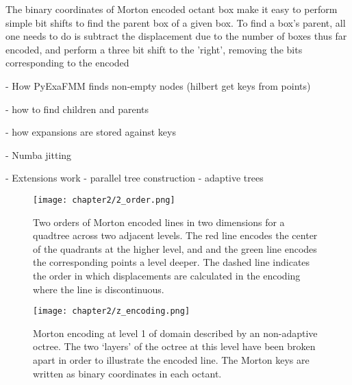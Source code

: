 The binary coordinates of Morton encoded octant box make it easy to perform simple
bit shifts to find the parent box of a given box. To find a box's parent, all
one needs to do is subtract the displacement due to the number of boxes thus
far encoded, and perform a three bit shift to the 'right', removing the bits
corresponding to the encoded

- How PyExaFMM finds non-empty nodes (hilbert get keys from points)

- how to find children and parents

- how expansions are stored against keys

- Numba jitting

- Extensions work
    - parallel tree construction
    - adaptive trees


\begin{figure}[!h]
    \centering
    {\texttt{[image: chapter2/2\_order.png]}}
    \vspace{0pt}
    \caption{
        Two orders of Morton encoded lines in two dimensions for a quadtree across
        two adjacent levels. The red line encodes the center of the quadrants at the higher level,
        and and the green line encodes the corresponding points a level deeper.
        The dashed line indicates the order in which displacements are calculated
        in the encoding where the line is discontinuous.
    }
    \label{fig:2_2_multi_order}
\end{figure}


\begin{figure}[!h]
    \centering
    {\texttt{[image: chapter2/z\_encoding.png]}}
    \vspace{0pt}
    \caption{
        Morton encoding at level 1 of domain described by an non-adaptive octree.
        The two `layers' of the octree at this level have been broken apart
        in order to illustrate the encoded line. The Morton keys are written
        as binary coordinates in each octant.
    }
    \label{fig:2_2_morton_encoding}
\end{figure}